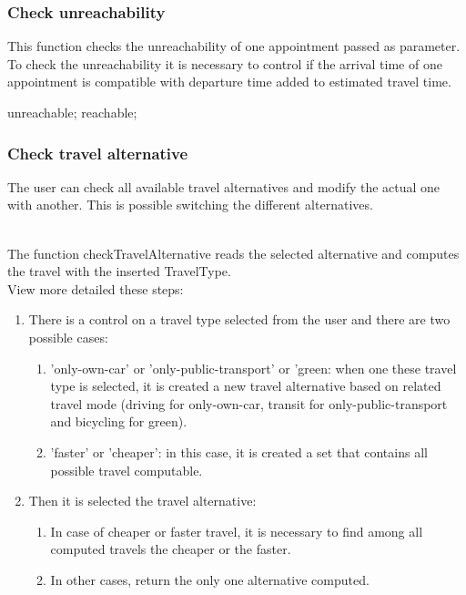 \subsubsection{Check unreachability}

This function checks the unreachability of one appointment passed as parameter.
To check the unreachability it is necessary to control if the arrival time of one appointment is compatible with departure time added to estimated travel time.

\begin{algorithmic}
	
			\State \Return unreachable;
		\Else 
			\State \Return reachable;
		\EndIf
	\EndFunction
\end{algorithmic}

\subsubsection{Check travel alternative}
The user can check all available travel alternatives and modify the actual one with another. This is possible switching the different alternatives.
\begin{figure}[!h]
	\centering
\end{figure}
\\The function checkTravelAlternative reads the selected alternative and computes the travel with the inserted TravelType.
\\View more detailed these steps:
\begin{enumerate}
	\item There is a control on a travel type selected from the user and there are two possible cases:
		\begin{enumerate}
			\item 'only-own-car' or 'only-public-transport' or 'green:
				when one these travel type is selected, it is created a new travel alternative based on related travel mode (driving for only-own-car, transit for only-public-transport and bicycling for green).
			\item 'faster' or 'cheaper':  in this case, it is created a set that contains all possible travel computable.
		\end{enumerate}
	\item Then it is selected the travel alternative:
		\begin{enumerate}
			\item In case of cheaper or faster travel, it is necessary to find among all computed travels the cheaper or the faster.
			\item In other cases, return the only one alternative computed.
		\end{enumerate}
\end{enumerate}

